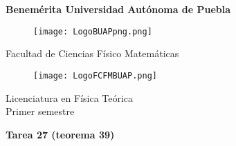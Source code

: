 \documentclass[12pt]{article}
\begin{document}
\begingroup
\begin{titlepage}
	\noindent
	\vspace{1mm}
\end{titlepage}
\endgroup

\pagestyle{empty} 
\setlength{\parindent}{0pt}
\sffamily


\begin{center} 

    \LARGE{\bf{\textsf{Benemérita Universidad Autónoma de Puebla}}} \\[0.5cm]
    
\begin{figure}[htb] \centering

    \texttt{[image: LogoBUAPpng.png]} 

\end{figure}


    \LARGE{Facultad de Ciencias Físico Matemáticas}\\[0.5cm]

\begin{figure}[htb] \centering

    \texttt{[image: LogoFCFMBUAP.png]} 
    
\end{figure} 


    \Large{Licenciatura en Física Teórica}\\[0.5cm]
    \Large{Primer semestre} 

\end{center} \vspace{0.3cm}

\begin{center}

    {\Large{\bfseries{{\textcolor{carrotorange}{Tarea 27 (teorema 39)}}}}} \\ 
    
\end{center}
\end{document}
